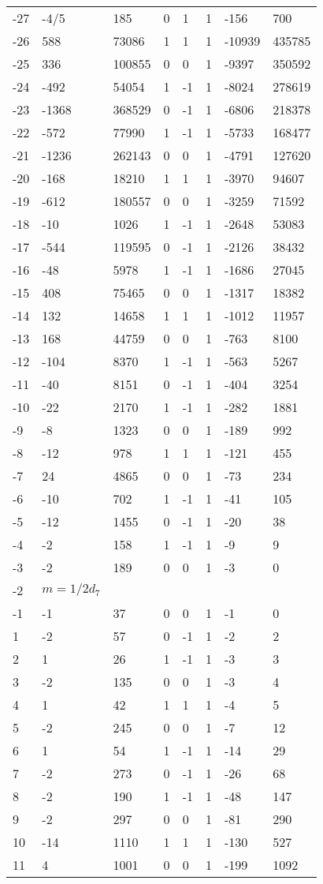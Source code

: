 \documentclass{amsart}
\begin{document}
\begin{longtable}{|l|l|l|lllll|}
-27&-4/5&185&0&1&1&-156&700\\
-26&588&73086&1&1&1&-10939&435785\\
-25&336&100855&0&0&1&-9397&350592\\
-24&-492&54054&1&-1&1&-8024&278619\\
-23&-1368&368529&0&-1&1&-6806&218378\\
-22&-572&77990&1&-1&1&-5733&168477\\
-21&-1236&262143&0&0&1&-4791&127620\\
-20&-168&18210&1&1&1&-3970&94607\\
-19&-612&180557&0&0&1&-3259&71592\\
-18&-10&1026&1&-1&1&-2648&53083\\
-17&-544&119595&0&-1&1&-2126&38432\\
-16&-48&5978&1&-1&1&-1686&27045\\
-15&408&75465&0&0&1&-1317&18382\\
-14&132&14658&1&1&1&-1012&11957\\
-13&168&44759&0&0&1&-763&8100\\
-12&-104&8370&1&-1&1&-563&5267\\
-11&-40&8151&0&-1&1&-404&3254\\
-10&-22&2170&1&-1&1&-282&1881\\
-9&-8&1323&0&0&1&-189&992\\
-8&-12&978&1&1&1&-121&455\\
-7&24&4865&0&0&1&-73&234\\
-6&-10&702&1&-1&1&-41&105\\
-5&-12&1455&0&-1&1&-20&38\\
-4&-2&158&1&-1&1&-9&9\\
-3&-2&189&0&0&1&-3&0\\
-2&$m=1/2d_{7}$&&\multicolumn{5}{c|}{}\\
-1&-1&37&0&0&1&-1&0\\
1&-2&57&0&-1&1&-2&2\\
2&1&26&1&-1&1&-3&3\\
3&-2&135&0&0&1&-3&4\\
4&1&42&1&1&1&-4&5\\
5&-2&245&0&0&1&-7&12\\
6&1&54&1&-1&1&-14&29\\
7&-2&273&0&-1&1&-26&68\\
8&-2&190&1&-1&1&-48&147\\
9&-2&297&0&0&1&-81&290\\
10&-14&1110&1&1&1&-130&527\\
11&4&1001&0&0&1&-199&1092\\

\end{longtable}
\end{document}
